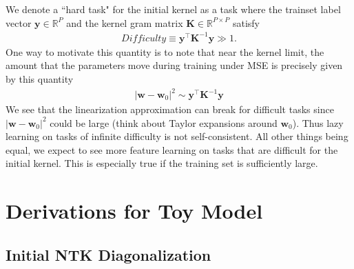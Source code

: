 \documentclass{article} %
\begin{document}
We denote a ``hard task" for the initial kernel as a task where the trainset label vector $\bm y \in \mathbb{R}^{P}$ and the kernel gram matrix $\bm K \in \mathbb{R}^{P \times P}$ satisfy 
\begin{align}
     \textit{Difficulty} \equiv \bm y^\top \bm K^{-1} \bm y \gg 1 .
\end{align}
One way to motivate this quantity is to note that near the kernel limit, the amount that the parameters move during training under MSE is precisely given by this quantity
\begin{align}
    |\bm{w}-\bm{w}_0|^2 \sim \bm y^\top \bm K^{-1} \bm y 
\end{align} 
We see that the linearization approximation can break for difficult tasks since $|\bm{w}- \bm{w}_0|^2$ could be large (think about Taylor expansions around $\bm{w}_0$). Thus lazy learning on tasks of infinite difficulty is not self-consistent. All other things being equal, we expect to see more feature learning on tasks that are difficult for the initial kernel. This is especially true if the training set is sufficiently large. 

\section{Derivations for Toy Model}\label{toymodel-derivations}

\subsection{Initial NTK Diagonalization}
\end{document}
